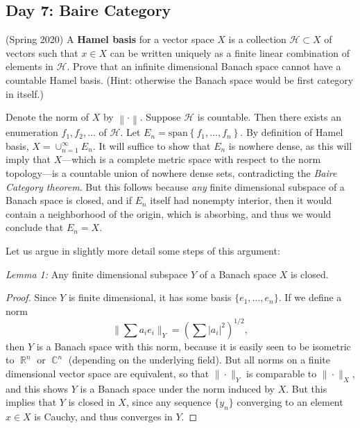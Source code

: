 \documentclass{exam}
\DeclareMathOperator{\CC}{\mathbb{C}}
\DeclareMathOperator{\RR}{\mathbb{R}}
\theoremstyle{problemstyle}
\newcommand{\norm}[1]{\left\lVert#1\right\rVert} %
\newcommand{\1}[1]{\textbf{1}_{\left[#1\right]}} %
\begin{document}
\begin{questions}
\newpage
\section{Day 7: Baire Category}

\item (Spring 2020)
  A \textbf{Hamel basis} for a vector space $X$ is a collection $\mathcal{H}\subset X$ of vectors such that $x\in X$ can be written uniquely as a finite linear combination of elements in $\mathcal{H}$. Prove that an infinite dimensional Banach space cannot have a countable Hamel basis. (Hint: otherwise the Banach space would be first category in itself.)

\begin{solution}
  Denote the norm of $X$ by $\norm{\cdot}$. Suppose $\mathcal{H}$ is countable. Then there exists an enumeration $f_{1},f_{2},\ldots$ of $\mathcal{H}$. Let $E_{n}= \text{span}\left\{ f_{1},\ldots,f_{n} \right\}$. By definition of Hamel basis, $X=\cup_{n=1}^{\infty} E_{n}$. It will suffice to show that $E_{n}$ is nowhere dense, as this will imply that $X$---which is a complete metric space with respect to the norm topology---is a countable union of nowhere dense sets, contradicting the \emph{Baire Category theorem}. But this follows because \emph{any} finite dimensional subspace of a Banach space is closed, and if $E_n$ itself had nonempty interior, then it would contain a neighborhood of the origin, which is absorbing, and thus we would conclude that $E_n = X$.

  Let us argue in slightly more detail some steps of this argument:

  \noindent \textit{Lemma 1:} Any finite dimensional subspace $Y$ of a Banach space $X$ is closed.
  \begin{proof}
  	Since $Y$ is finite dimensional, it has some basis $\{ e_1, \dots, e_n \}$. If we define a norm
  	\[ \| \sum a_i e_i \|_Y = \left( \sum |a_i|^2 \right)^{1/2}, \]
  	then $Y$ is a Banach space with this norm, because it is easily seen to be isometric to $\RR^n$ or $\CC^n$ (depending on the underlying field). But all norms on a finite dimensional vector space are equivalent, so that $\| \cdot \|_Y$ is comparable to $\| \cdot \|_X$, and this shows $Y$ is a Banach space under the norm induced by $X$. But this implies that $Y$ is closed in $X$, since any sequence $\{ y_n \}$ converging to an element $x \in X$ is Cauchy, and thus converges in $Y$.
  \end{proof}


\end{solution}
\end{questions}
\end{document}
